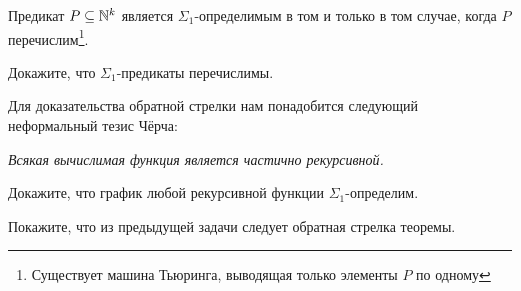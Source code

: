 \documentclass[a4paper, 12pt, num=Г2]{listok}
\begin{document}
\begin{theorem}
	Предикат $P \subseteq \mathbb{N}^k$ является $\Sigma_1$-определимым в том и только в том случае, когда $P$ перечислим\footnote{%
	Существует машина Тьюринга, выводящая только элементы $P$ по одному}.
\end{theorem}
\begin{problem}[ (Тогдатость)]
	Докажите, что $\Sigma_1$-предикаты перечислимы.
\end{problem}
Для доказательства обратной стрелки нам понадобится следующий неформальный тезис Чёрча:
\begin{center}
	\textit{Всякая вычислимая функция является частично рекурсивной.}
\end{center}
\begin{problem}
	Докажите, что график любой рекурсивной функции $\Sigma_1$-определим.
\end{problem}
\begin{problem}
	Покажите, что из предыдущей задачи следует обратная стрелка теоремы.
\end{problem}
\end{document}
